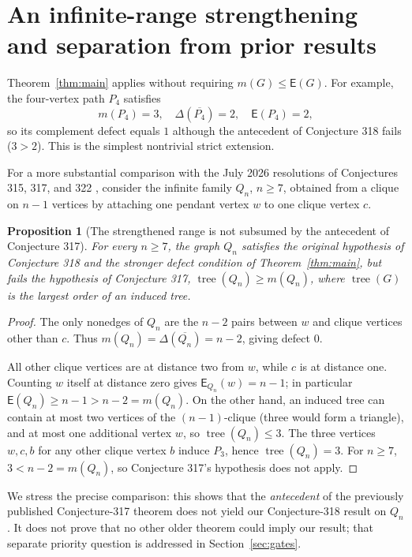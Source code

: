\documentclass[11pt,a4paper]{article}
\newtheorem{proposition}[theorem]{Proposition}
\theoremstyle{definition}\newtheorem{definition}[theorem]{Definition}
\theoremstyle{remark}\newtheorem{remark}[theorem]{Remark}
\newcommand{\epar}{\mathsf E}
\begin{document}
\section{An infinite-range strengthening and separation from prior results}\label{sec:range}
Theorem~\ref{thm:main} applies without requiring $m(G)\le\epar(G)$. For example, the four-vertex path $P_4$ satisfies
\[m(P_4)=3,\quad \Delta(\overline{P_4})=2,\quad\epar(P_4)=2,\]
so its complement defect equals $1$ although the antecedent of Conjecture 318 fails ($3>2$). This is the simplest nontrivial strict extension.

For a more substantial comparison with the July 2026 resolutions of Conjectures 315, 317, and 322 \cite{Gebendorfer2026}, consider the infinite family $Q_n$, $n\ge7$, obtained from a clique on $n-1$ vertices by attaching one pendant vertex $w$ to one clique vertex $c$.

\begin{proposition}[The strengthened range is not subsumed by the antecedent of Conjecture 317]\label{prop:range}
For every $n\ge7$, the graph $Q_n$ satisfies the original hypothesis of Conjecture 318 and the stronger defect condition of Theorem~\ref{thm:main}, but fails the hypothesis of Conjecture 317, $\operatorname{tree}(Q_n)\ge m(Q_n)$, where $\operatorname{tree}(G)$ is the largest order of an induced tree.
\end{proposition}
\begin{proof}
The only nonedges of $Q_n$ are the $n-2$ pairs between $w$ and clique vertices other than $c$. Thus $m(Q_n)=\Delta(\overline{Q_n})=n-2$, giving defect $0$.

All other clique vertices are at distance two from $w$, while $c$ is at distance one. Counting $w$ itself at distance zero gives $\epar_{Q_n}(w)=n-1$; in particular $\epar(Q_n)\ge n-1>n-2=m(Q_n)$. On the other hand, an induced tree can contain at most two vertices of the $(n-1)$-clique (three would form a triangle), and at most one additional vertex $w$, so $\operatorname{tree}(Q_n)\le3$. The three vertices $w,c,b$ for any other clique vertex $b$ induce $P_3$, hence $\operatorname{tree}(Q_n)=3$. For $n\ge7$, $3<n-2=m(Q_n)$, so Conjecture 317's hypothesis does not apply.
\end{proof}

We stress the precise comparison: this shows that the \emph{antecedent} of the previously published Conjecture-317 theorem does not yield our Conjecture-318 result on $Q_n$. It does not prove that no other older theorem could imply our result; that separate priority question is addressed in Section~\ref{sec:gates}.
\end{document}
